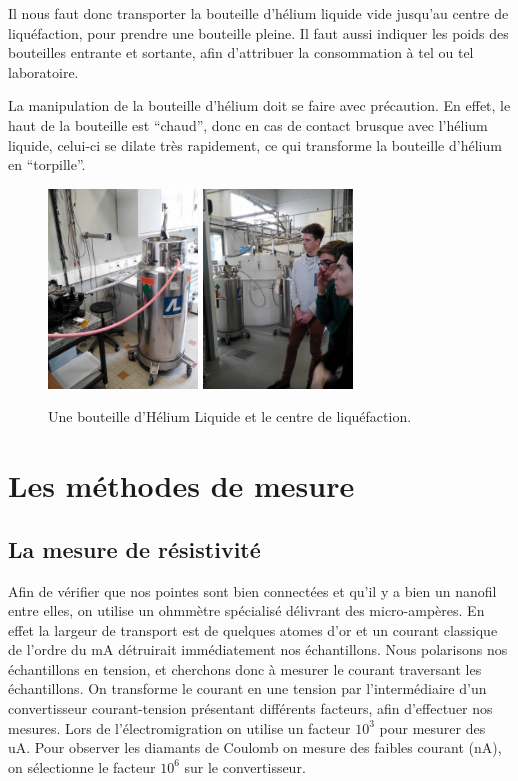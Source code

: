 Il nous faut donc transporter la bouteille d'hélium liquide vide jusqu'au centre de liquéfaction, pour prendre une bouteille pleine. Il faut aussi indiquer les poids des bouteilles entrante et sortante, afin d'attribuer la consommation à tel ou tel laboratoire.

La manipulation de la bouteille d'hélium doit se faire avec précaution. En effet, le haut de la bouteille est “chaud”, donc en cas de contact brusque avec l'hélium liquide, celui-ci se dilate très rapidement, ce qui transforme la bouteille d'hélium en “torpille”.
\begin{figure}[h]
    \begin{center}
        \includegraphics[width=150px]{Photos/Bouteille_Helium_Liquide.jpg}
        \includegraphics[width=150px]{Photos/Centre_Helium_Liquide.jpg}
        \caption{Une bouteille d'Hélium Liquide et le centre de liquéfaction.}
        \label{fig:}
    \end{center}
\end{figure}

\section{Les méthodes de mesure}
\subsection{La mesure de résistivité}
Afin de vérifier que nos pointes sont bien connectées et qu'il y a bien un nanofil entre elles, on utilise un ohmmètre spécialisé délivrant des micro-ampères. En effet la largeur de transport est de quelques atomes d'or et un courant classique de l'ordre du mA détruirait immédiatement nos échantillons.
Nous polarisons nos échantillons en tension, et cherchons donc à mesurer le courant traversant les échantillons.
On transforme le courant en une tension par l'intermédiaire d'un convertisseur courant-tension présentant différents facteurs, afin d'effectuer nos mesures. Lors de l'électromigration on utilise un facteur $10^3$ pour mesurer des uA.
Pour observer les diamants de Coulomb on mesure des faibles courant (nA),  on sélectionne le facteur $10^6$ sur le convertisseur. 

